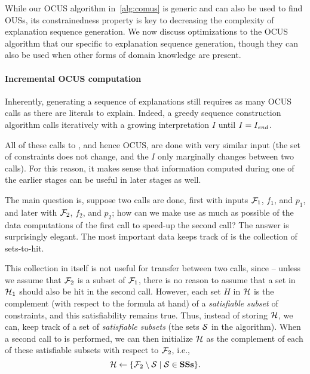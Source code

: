 While our OCUS algorithm in~\ref{alg:comus} is generic and can also be used to find OUSs, its constrainedness property is key to decreasing the complexity of explanation sequence generation. We now discuss optimizations to the OCUS algorithm that our specific to explanation sequence generation, though they can also
be used when other forms of domain knowledge are present.  


\paragraph{Incremental OCUS computation}
Inherently, generating a sequence of explanations still requires as many OCUS calls as there are literals to explain. 
Indeed, a greedy sequence construction algorithm %
calls \onestepo iteratively with a growing interpretation $I$ until $I=I_\mathit{end} $.

All of these calls to \onestepo, and hence OCUS, are done with very similar input (the set of constraints does not change, and the $I$ only marginally changes between two calls). For this reason, it makes sense that information computed during one of the earlier stages can be useful in later stages as well. 

The main question is, suppose two \comus calls are done, first with inputs $\mathcal{F} _1$, $f_1$, and $p_1$, and later with $\mathcal{F} _2$, $f_2$, and $p_2$; how can we make use as much as possible of the data computations of the first call to speed-up the second call? The answer is surprisingly elegant. The most important data \comus keeps track of  is the collection \setstohit of sets-to-hit.

This collection in itself is not useful for transfer between two calls, since -- unless we assume that $\mathcal{F} _2$ is a subset of $\mathcal{F} _1$, there is no reason to assume that a set in $\mathcal{H} _1$ should also be hit in the second call. 
However, each set $H$ in $\mathcal{H} $ is the complement (with respect to the formula at hand) of a \emph{satisfiable subset} of constraints, and this satisfiability remains true. 
Thus, instead of storing $\mathcal{H} $, we can, keep track of a set \satsets of \emph{satisfiable subsets} (the sets $\mathcal{S}$ in the \comus algorithm). 
When a second call to \comus is performed, we can then initialize $\mathcal{H} $ as the complement of each of these satisfiable subsets with respect to $\mathcal{F} _2$, i.e., \[\mathcal{H} \gets \{\mathcal{F} _2\setminus \mathcal{S}\mid \mathcal{S}\in \mathbf{SSs}\}.\]

